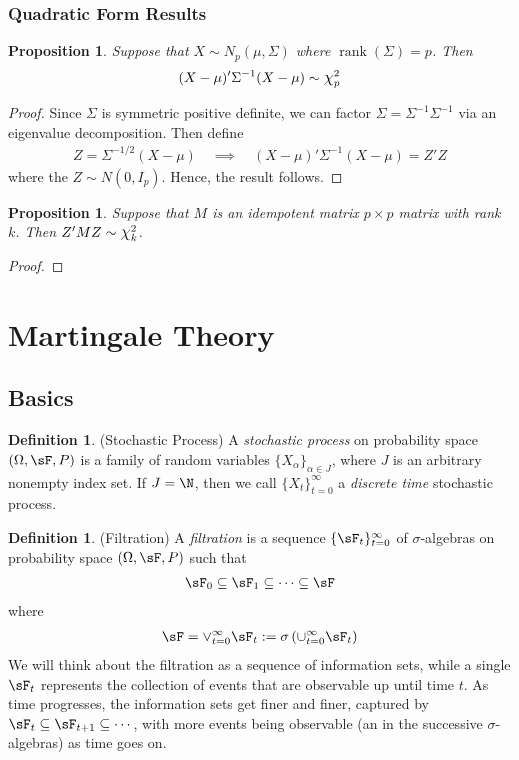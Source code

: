 \documentclass[12pt]{article}
\theoremstyle{plain}
\newtheorem{prop}[thm]{Proposition}
\theoremstyle{definition}
\newtheorem{defn}[thm]{Definition}
\theoremstyle{remark}
\newcommand*{\Chi}{\mbox{\large$\chi$}} %
\newcommand{\rank}{\operatorname{rank}}
\newcommand{\tinfz}{_{t=0}^\infty}
\begin{document}
\clearpage
\subsubsection{Quadratic Form Results}

\begin{prop}
Suppose that $X\sim N_p(\mu,\Sigma)$ where $\rank(\Sigma)=p$. Then
\begin{align*}
  (X-\mu)'\Sigma^{-1}(X-\mu) \sim \Chi_p^2
\end{align*}
\end{prop}
\begin{proof}
Since $\Sigma$ is symmetric positive definite, we can factor
$\Sigma=\Sigma^{-1}\Sigma^{-1}$ via an eigenvalue decomposition. Then
define
\begin{align*}
  Z = \Sigma^{-1/2}(X-\mu)
  \quad\implies\quad
  (X-\mu)'\Sigma^{-1}(X-\mu)
  = Z'Z
\end{align*}
where the $Z\sim N(0,I_p)$. Hence, the result follows.
\end{proof}

\begin{prop}
Suppose that $M$ is an idempotent matrix $p\times p$ matrix with rank
$k$. Then $Z'MZ\sim \Chi^2_k$.
\end{prop}
\begin{proof}
\end{proof}


\clearpage
\section{Martingale Theory}

\subsection{Basics}
\begin{defn}(Stochastic Process)
A \emph{stochastic process} on probability space $(\Omega,\sF,P)$ is a
family of random variables $\{X_\alpha\}_{\alpha\in J}$, where $J$ is an
arbitrary nonempty index set.
If $J=\N$, then we call $\{X_t\}\tinfz$ a \emph{discrete time}
stochastic process.
\end{defn}

\begin{defn}(Filtration)
A \emph{filtration} is a sequence $\{\sF_t\}\tinfz$ of $\sigma$-algebras
on probability space $(\Omega,\sF,P)$ such that
\begin{align*}
  \sF_0 \subseteq \sF_1 \subseteq \cdots \subseteq\sF
\end{align*}
where
\begin{align*}
  \sF = \vee\tinfz \sF_t := \sigma\left(\cup\tinfz \sF_t\right)
\end{align*}
We will think about the filtration as a sequence of information sets,
while a single $\sF_t$ represents the collection of events that are
observable up until time $t$. As time progresses, the information sets
get finer and finer, captured by
$\sF_t\subseteq \sF_{t+1}\subseteq\cdots$, with more events being
observable (an in the successive $\sigma$-algebras) as time goes on.
\end{defn}
\end{document}
